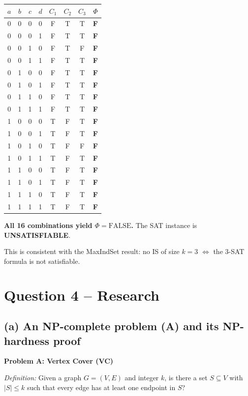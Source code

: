 \documentclass[12pt]{article}
\begin{document}
\medskip
\begin{center}
\begin{tabular}{|c|c|c|c|c|c|c|c|}
\hline
$a$ & $b$ & $c$ & $d$ & $C_1$ & $C_2$ & $C_3$ & $\Phi$ \\
\hline
0&0&0&0& F&T&T&\textbf{F}\\
0&0&0&1& F&T&T&\textbf{F}\\
0&0&1&0& F&T&F&\textbf{F}\\
0&0&1&1& F&T&T&\textbf{F}\\
0&1&0&0& F&T&T&\textbf{F}\\
0&1&0&1& F&T&T&\textbf{F}\\
0&1&1&0& F&T&T&\textbf{F}\\
0&1&1&1& F&T&T&\textbf{F}\\
1&0&0&0& T&F&T&\textbf{F}\\
1&0&0&1& T&F&T&\textbf{F}\\
1&0&1&0& T&F&F&\textbf{F}\\
1&0&1&1& T&F&T&\textbf{F}\\
1&1&0&0& T&F&T&\textbf{F}\\
1&1&0&1& T&F&T&\textbf{F}\\
1&1&1&0& T&F&T&\textbf{F}\\
1&1&1&1& T&F&T&\textbf{F}\\
\hline
\end{tabular}
\end{center}

\textbf{All 16 combinations yield $\Phi = \mathrm{FALSE}$.}  The SAT instance
is \textbf{UNSATISFIABLE}.

This is consistent with the MaxIndSet result: no IS of size $k{=}3$
$\Leftrightarrow$ the 3-SAT formula is not satisfiable.

\section*{Question 4 -- Research}

\subsection*{(a) An NP-complete problem (A) and its NP-hardness proof}

\textbf{Problem A: Vertex Cover (VC)}

\textit{Definition:}  Given a graph $G=(V,E)$ and integer $k$, is there a set
$S\subseteq V$ with $|S|\le k$ such that every edge has at least one endpoint
in $S$?
\end{document}
